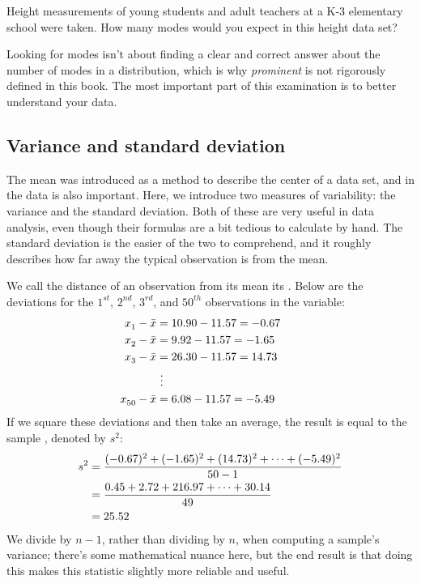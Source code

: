 \begin{exercisewrap}
\begin{nexercise}
Height measurements of young students and adult teachers
at a K-3 elementary school were taken.
How many modes would you expect in this height
data set?\footnotemark{}
\end{nexercise}
\end{exercisewrap}

Looking for modes isn't about finding a clear and correct
answer about the number of modes in a distribution,
which is why \emph{prominent} is not
rigorously defined in this book.
The most important part of this examination is to better
understand your data.



\D{\newpage}

\subsection{Variance and standard deviation}
\label{variability}

The mean was introduced as a method to describe the center of
a data set, and  in the
data is also important.
Here, we introduce two measures of variability:
the variance and the standard deviation.
Both of these are very useful in data analysis,
even though their formulas are a bit tedious to calculate
by hand.
The standard deviation is the easier of the two to comprehend,
and it roughly describes how far away the typical observation
is from the mean.

We call the distance of an observation from its mean its . Below are the deviations for the $1^{st}_{}$, $2^{nd}_{}$, $3^{rd}$, and $50^{th}_{}$ observations in the  variable:
\begin{align*}
x_1^{}-\bar{x} &= 10.90 - 11.57{} = -0.67 \hspace{5mm}\text{ } \\
x_2^{}-\bar{x} &= 9.92 - 11.57{} = -1.65 \\
x_3^{}-\bar{x} &= 26.30 - 11.57{} = 14.73 \\
			&\ \vdots \\
x_{50}^{}-\bar{x} &= 6.08 - 11.57{} = -5.49
\end{align*}
If we square these deviations and then take an average,
the result is equal to the sample
\label{varianceIsDefined},
denoted by $s_{}^2$:
\begin{align*}
s_{}^2 &= \frac{(-0.67)_{}^2 + (-1.65)_{}^2 + (14.73)_{}^2 + \cdots + (-5.49)_{}^2}{50{}-1} \\
	&= \frac{0.45 + 2.72 + 216.97 + \cdots + 30.14}{49} \\
	&= 25.52{}
\end{align*}
We divide by $n - 1$, rather than dividing by $n$,
when computing a sample's variance;
there's some mathematical nuance here, but the end result is that
doing this makes this statistic slightly more reliable and useful.

